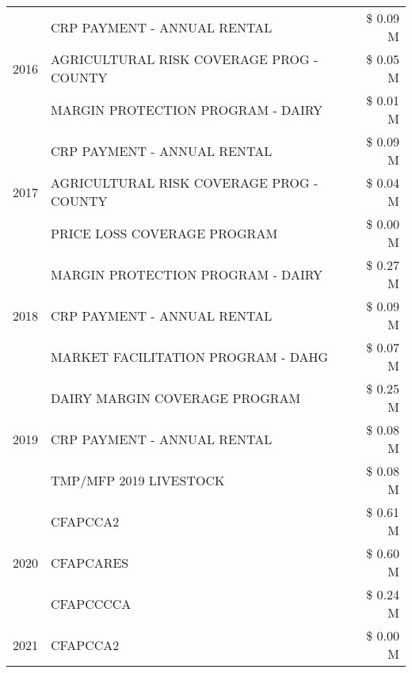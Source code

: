 \begin{tabular}{llr}
\cline{1-3}
\multirow[t]{3}{*}{2016} & CRP PAYMENT - ANNUAL RENTAL & \$ 0.09 M \\
 & AGRICULTURAL RISK COVERAGE PROG - COUNTY & \$ 0.05 M \\
 & MARGIN PROTECTION PROGRAM - DAIRY & \$ 0.01 M \\
\cline{1-3}
\multirow[t]{3}{*}{2017} & CRP PAYMENT - ANNUAL RENTAL & \$ 0.09 M \\
 & AGRICULTURAL RISK COVERAGE PROG - COUNTY & \$ 0.04 M \\
 & PRICE LOSS COVERAGE PROGRAM & \$ 0.00 M \\
\cline{1-3}
\multirow[t]{3}{*}{2018} & MARGIN PROTECTION PROGRAM - DAIRY & \$ 0.27 M \\
 & CRP PAYMENT - ANNUAL RENTAL & \$ 0.09 M \\
 & MARKET FACILITATION PROGRAM - DAHG & \$ 0.07 M \\
\cline{1-3}
\multirow[t]{3}{*}{2019} & DAIRY MARGIN COVERAGE PROGRAM & \$ 0.25 M \\
 & CRP PAYMENT - ANNUAL RENTAL & \$ 0.08 M \\
 & TMP/MFP 2019 LIVESTOCK & \$ 0.08 M \\
\cline{1-3}
\multirow[t]{3}{*}{2020} & CFAPCCA2 & \$ 0.61 M \\
 & CFAPCARES & \$ 0.60 M \\
 & CFAPCCCCA & \$ 0.24 M \\
\cline{1-3}
2021 & CFAPCCA2 & \$ 0.00 M \\
\cline{1-3}
\bottomrule
\end{tabular}
